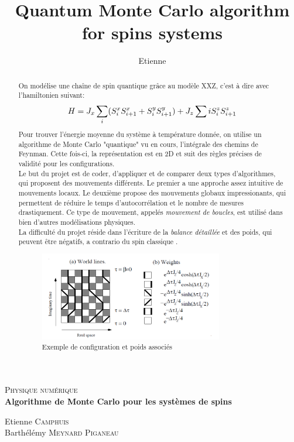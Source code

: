 \documentclass[a4paper,12pt]{article}
\title{Quantum Monte Carlo algorithm for spins systems}
\author{Etienne \bsc{Camphuis}}
\begin{document}
	\begin{titlepage}
		\begin{center}
			\textsc{\Large Physique numérique}\\[1.5cm]
			
			{ \large \bfseries Algorithme de Monte Carlo pour les systèmes de spins\\[0.3cm] }
		\begin{abstract}
			On modélise une chaîne de spin quantique grâce au modèle XXZ, c'est à dire avec l'hamiltonien suivant:
			\begin{equation}
				\centering
				H =  J_x \sum_{i} ( S_i^xS_{i+1}^x + S_i^yS_{i+1}^y ) + J_z \sum{i} S_i^zS_{i+1}^z
			\end{equation}
			Pour trouver l'énergie moyenne du système à température donnée, on utilise un algorithme de Monte Carlo "quantique" vu en cours, l'intégrale des chemins de Feynman. Cette fois-ci, la représentation est en 2D et suit des règles précises de validité pour les configurations. \\
			Le but du projet est de coder, d'appliquer et de comparer deux types d'algorithmes, qui proposent des mouvements différents. Le premier a une approche assez intuitive de mouvements locaux. Le deuxième propose des mouvements globaux impressionants, qui permettent de réduire le temps d'autocorrélation et le nombre de mesures drastiquement. Ce type de mouvement, appelés \emph{mouvement de boucles}, est utilisé dans bien d'autres modélisations physiques. \\
			La difficulté du projet réside dans l'écriture de la \emph{balance détaillée} et des poids, qui peuvent être négatifs, a contrario du spin \og classique \fg.
			\begin{figure}[H]
				\centering
				\includegraphics[width=8cm]{pathintegral.png}
				\caption{Exemple de configuration et poids associés}
			\end{figure}
		\end{abstract}
		\vfill
		\begin{minipage}{0.7\textwidth}
			\centering
			Etienne \textsc{Camphuis}\\
			Barthélémy \textsc{Meynard Piganeau} \\
		\end{minipage}
		\end{center}
	\end{titlepage}
\end{document}

